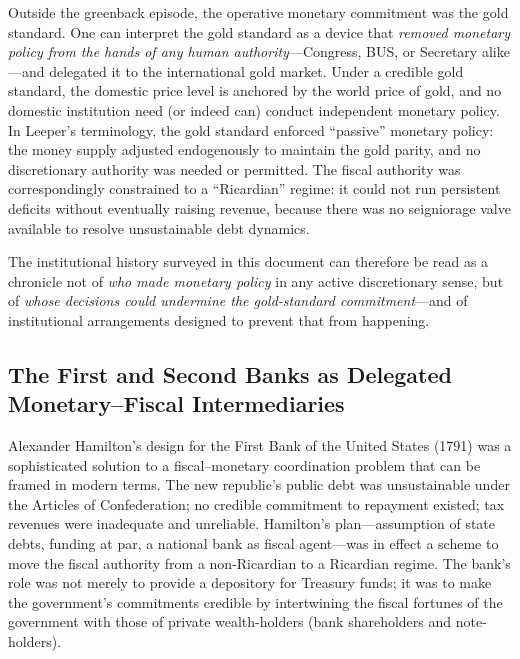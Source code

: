 \documentclass[12pt]{article}
\begin{document}
Outside the greenback episode, the operative monetary commitment
was the gold standard.  One can interpret the gold standard as a device
that \emph{removed monetary policy from the hands of any human
authority}---Congress, BUS, or Secretary alike---and delegated it to
the international gold market.  Under a credible gold standard, the
domestic price level is anchored by the world price of gold, and no
domestic institution need (or indeed can) conduct independent monetary
policy.  In Leeper's terminology, the gold standard enforced
``passive'' monetary policy: the money supply adjusted endogenously
to maintain the gold parity, and no discretionary authority was needed
or permitted.  The fiscal authority was correspondingly constrained to
a ``Ricardian'' regime: it could not run persistent deficits without
eventually raising revenue, because there was no seigniorage valve
available to resolve unsustainable debt dynamics.

The institutional history surveyed in this document can therefore be
read as a chronicle not of \emph{who made monetary policy} in any
active discretionary sense, but of \emph{whose decisions could
undermine the gold-standard commitment}---and of institutional
arrangements designed to prevent that from happening.

\subsection{The First and Second Banks as Delegated Monetary--Fiscal
Intermediaries}

Alexander Hamilton's design for the First Bank of the United States
(1791) was a sophisticated solution to a fiscal--monetary coordination
problem that can be framed in modern terms.  The new republic's public
debt was unsustainable under the Articles of Confederation; no credible
commitment to repayment existed; tax revenues were inadequate and
unreliable.  Hamilton's plan---assumption of state debts, funding at par,
a national bank as fiscal agent---was in effect a scheme to move the
fiscal authority from a non-Ricardian to a Ricardian regime.  The
bank's role was not merely to provide a depository for Treasury funds;
it was to make the government's commitments credible by intertwining
the fiscal fortunes of the government with those of private
wealth-holders (bank shareholders and note-holders).
\end{document}
